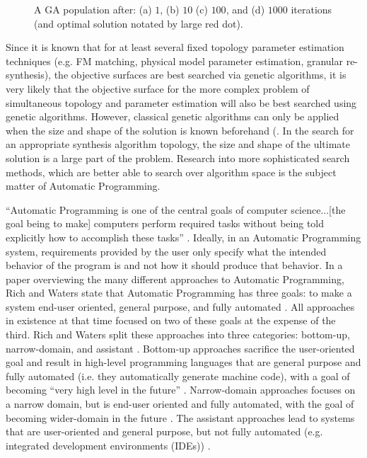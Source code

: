 \documentclass[a4paper,12pt]{report} 	%
\numberwithin{figure}{chapter}
\numberwithin{table}{chapter}
\numberwithin{equation}{chapter}
\begin{document}
\begin{flushleft}
\begin{figure}[h!]
\begin{center}
\caption[GA Example]{A GA population after: (a) $1$, (b) $10$ (c) $100$, and (d) $1000$ iterations (and optimal solution notated by large red dot).}
\end{center}
\end{figure}
Since it is known that for at least several fixed topology parameter estimation techniques (e.g. FM matching, physical model parameter estimation, granular re-synthesis), the objective surfaces are best searched via genetic algorithms, it is very likely that the objective surface for the more complex problem of simultaneous topology and parameter estimation will also be best searched using genetic algorithms. However, classical genetic algorithms can only be applied when the size and shape of the solution is known beforehand (\cite[p. 42]{Vanneschi:2004le}. In the search for an appropriate synthesis algorithm topology, the size and shape of the ultimate solution is a large part of the problem. Research into more sophisticated search methods, which are better able to search over algorithm space is the subject matter of Automatic Programming.

``Automatic Programming is one of the central goals of computer science...[the goal being to make] computers perform required tasks without being told explicitly how to accomplish these tasks'' \cite[p.3]{Koza:1997zr}. Ideally, in an Automatic Programming system, requirements provided by the user only specify what the intended behavior of the program is and not how it should produce that behavior. In a paper overviewing the many different approaches to Automatic Programming, Rich and Waters \cite{Rich:1992sp} state that Automatic Programming has three goals: to make a system end-user oriented, general purpose, and fully automated \cite[p. 4]{Rich:1992sp}. All approaches in existence at that time focused on two of these goals at the expense of the third. Rich and Waters split these approaches into three categories: bottom-up, narrow-domain, and assistant \cite[p. 3]{Rich:1992sp}. Bottom-up approaches sacrifice the user-oriented goal and result in high-level programming languages that are general purpose and fully automated (i.e. they automatically generate machine code), with a goal of becoming ``very high level in the future'' \cite[p. 3]{Rich:1992sp}. Narrow-domain approaches focuses on a narrow domain, but is end-user oriented and fully automated, with the goal of becoming wider-domain in the future \cite[p. 4]{Rich:1992sp}. The assistant approaches lead to systems that are user-oriented and general purpose, but not fully automated (e.g. integrated development environments (IDEs)) \cite[p. 4]{Rich:1992sp}. 


\end{flushleft}
\end{document}
